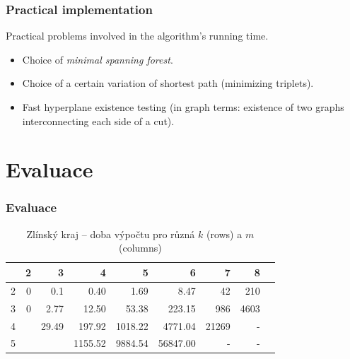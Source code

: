 \documentclass[10pt]{beamer}
\newcommand{\evenrowcolor}{\rowcolor[gray]{0.925}}
\begin{document}
\begin{frame}
	\frametitle{Practical implementation}

	Practical problems involved in the algorithm's running time.

	\begin{itemize}
		\item Choice of \textit{minimal spanning forest}.
		\item Choice of a certain variation of shortest path (minimizing triplets).
		\item Fast hyperplane existence testing (in graph terms: existence of two graphs interconnecting each side of a cut).
	\end{itemize}

\end{frame}

\section{Evaluace}

\begin{frame}
	\frametitle{Evaluace}

	\center

\begin{table}[H]
	\caption{Zlínský kraj -- doba výpočtu pro různá $k$ (rows) a $m$ (columns)}
	\centering
	\begin{tabular}{c|rrrrrrrr}

\toprule

	&         2 &         3 &         4 &         5 &         6 &         7 &		8 	\\ \midrule
 2	&      0 &      0.1 &      0.40 &      1.69 &      8.47 &     42 &	210	\\
\evenrowcolor
 3	&      0 &      2.77 &     12.50 &     53.38 &    223.15 &    986 &	4603	\\
 4	&           &     29.49 &    197.92 &   1018.22 &   4771.04 &  21269 &	-		\\
\evenrowcolor
 5	&           &           &   1155.52 &   9884.54 &  56847.00 &	-	   & 	-		\\

	\end{tabular}
\end{table}

\end{frame}
\end{document}

